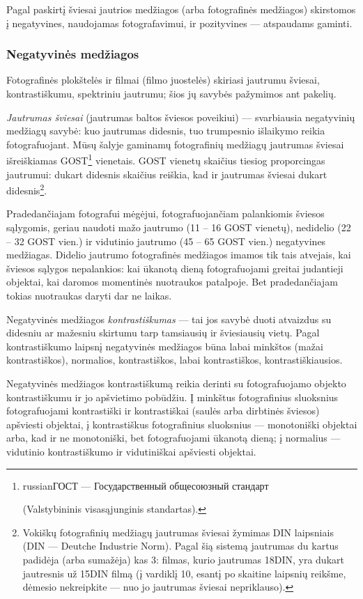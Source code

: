 \documentclass[12pt]{book}
\begin{document}
				Pagal paskirtį šviesai jautrios medžiagos (arba fotografinės medžiagos) skirstomos į negatyvines, naudojamas fotografavimui, ir pozityvines --- atspaudams gaminti.

				\subsubsection*{Negatyvinės medžiagos}
					Fotografinės plokštelės ir filmai (filmo juostelės) skiriasi jautrumu šviesai, kontrastiškumu, spektriniu jautrumu; šios jų savybės pažymimos ant pakelių.

					\textit{Jautrumas šviesai} (jautrumas baltos šviesos poveikiui) --- svarbiausia negatyvinių medžiagų savybė: kuo jautrumas didesnis, tuo trumpesnio išlaikymo reikia fotografuojant. Mūsų šalyje gaminamų fotografinių medžiagų jautrumas šviesai išreiškiamas GOST\footnote{\begin{otherlanguage*}{russian}ГОСТ --- Государственный общесоюзный стандарт\end{otherlanguage*} (Valstybininis visasąjunginis standartas).} vienetais. GOST vienetų skaičius tiesiog proporcingas jautrumui: dukart didesnis skaičius reiškia, kad ir jautrumas šviesai dukart didesnis\footnote{Vokiškų fotografinių medžiagų jautrumas šviesai žymimas DIN laipsniais (DIN --- Deutche Industrie Norm). Pagal šią sistemą jautrumas du kartus padidėja (arba sumažėja) kas 3\degree: filmas, kurio jautrumas 18\degree DIN, yra dukart jautresnis už 15\degree DIN filmą (į vardiklį 10, esantį po skaitine laipsnių reikšme, dėmesio nekreipkite --- nuo jo jautrumas šviesai nepriklauso).}.

					Pradedančiajam fotografui mėgėjui, fotografuojančiam palankiomis šviesos sąlygomis, geriau naudoti mažo jautrumo (11 -- 16 GOST vienetų), nedidelio (22 -- 32 GOST vien.) ir vidutinio jautrumo (45 -- 65 GOST vien.) negatyvines medžiagas. Didelio jautrumo fotografinės medžiagos imamos tik tais atvejais, kai šviesos sąlygos nepalankios: kai ūkanotą dieną fotografuojami greitai judantieji objektai, kai daromos momentinės nuotraukos patalpoje. Bet pradedančiajam tokias nuotraukas daryti dar ne laikas.

					Negatyvinės medžiagos \textit{kontrastiškumas} --- tai jos savybė duoti atvaizdus su didesniu ar mažesniu skirtumu tarp tamsiausių ir šviesiausių vietų. Pagal kontrastiškumo laipsnį negatyvinės medžiagos būna labai minkštos (mažai kontrastiškos), normalios, kontrastiškos, labai kontrastiškos, kontrastiškiausios.

					Negatyvinės medžiagos kontrastiškumą reikia derinti su fotografuojamo objekto kontrastiškumu ir jo apšvietimo pobūdžiu. Į minkštus fotografinius sluoksnius fotografuojami kontrastiški ir kontrastiškai (saulės arba dirbtinės šviesos) apšviesti objektai, į kontrastiškus fotografinius sluoksnius --- monotoniški objektai arba, kad ir ne monotoniški, bet fotografuojami ūkanotą dieną; į normalius --- vidutinio kontrastiškumo ir vidutiniškai apšviesti objektai.
\end{document}
